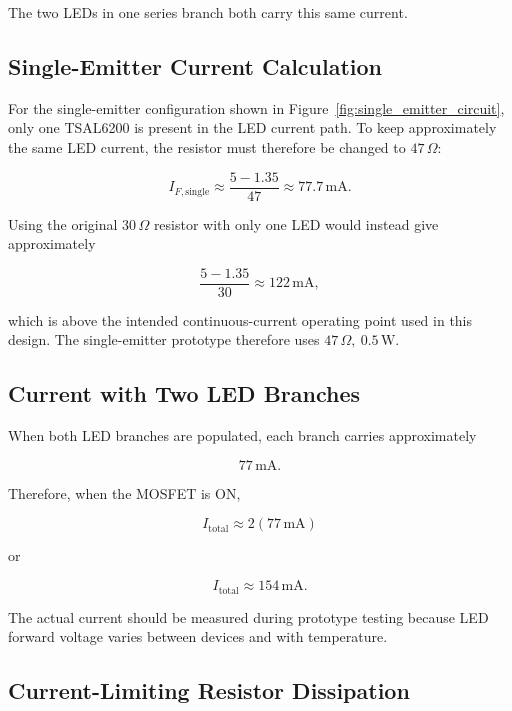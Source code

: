 \documentclass[a4paper,12pt]{article}
\begin{document}
The two LEDs in one series branch both carry this same current.


\subsection{Single-Emitter Current Calculation}

For the single-emitter configuration shown in
Figure~\ref{fig:single_emitter_circuit}, only one TSAL6200 is present in the
LED current path. To keep approximately the same LED current, the resistor
must therefore be changed to \(47\,\Omega\):

\[
I_{F,\text{single}}
\approx
\frac{5-1.35}{47}
\approx
77.7\,\text{mA}.
\]

Using the original \(30\,\Omega\) resistor with only one LED would instead
give approximately

\[
\frac{5-1.35}{30}
\approx
122\,\text{mA},
\]

which is above the intended continuous-current operating point used in this
design. The single-emitter prototype therefore uses
\(47\,\Omega,\ 0.5\,\text{W}\).



\subsection{Current with Two LED Branches}

When both LED branches are populated, each branch carries approximately

\[
77\,\text{mA}.
\]

Therefore, when the MOSFET is ON,

\[
I_{\text{total}}
\approx
2(77\,\text{mA})
\]

or

\[
\boxed{
I_{\text{total}}
\approx
154\,\text{mA}
}.
\]

The actual current should be measured during prototype testing because
LED forward voltage varies between devices and with temperature.



\subsection{Current-Limiting Resistor Dissipation}
\end{document}
